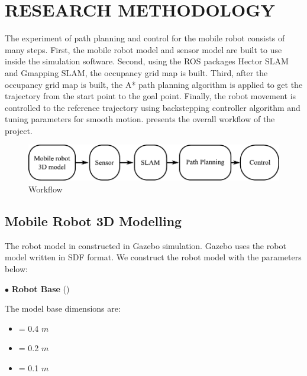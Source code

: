 \section{RESEARCH METHODOLOGY}
\hspace{1.27cm}
The experiment of path planning and control for the mobile robot consists of many steps. First, the mobile robot model and sensor model are built to use inside the simulation software. Second, using the ROS packages Hector SLAM and Gmapping SLAM, the occupancy grid map is built. Third, after the occupancy grid map is built, the A* path planning algorithm is applied to get the trajectory from the start point to the goal point. Finally, the robot movement is controlled to the reference trajectory using backstepping controller algorithm and tuning parameters for smooth motion. \textbf{\figureautorefname{ \ref{fig:Workflow}}} presents the overall workflow of the project.\par

\begin{figure}[ht]
	\centering
	\includegraphics[scale=1]{images/imagess/3method-workflow.pdf}
	\caption{Workflow}
	\label{fig:Workflow}
\end{figure}

\subsection{Mobile Robot 3D Modelling}
\hspace{1.27cm}
The robot model in constructed in Gazebo simulation. Gazebo uses the robot model written in SDF format. We construct the robot model with the parameters below: \par

$\bullet$ \textbf{Robot Base} (\textbf{\figureautorefname{ \ref{fig:Mobile Robot Base}}})\par
The model base dimensions are:
\begin{itemize}
	\item { = 0.4 $m$}
	\item { = 0.2 $m$}
	\item { = 0.1 $m$}
\end{itemize}

